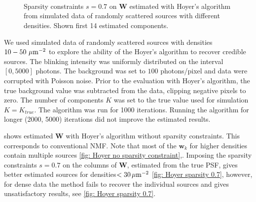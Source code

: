 \begin{figure}[b!] %
	\newcommand{\sizefig}{.9}
	\centering
	\\
	\\
	\\	
	\caption{Sparsity constraints $s=0.7$ on $\bm{W}$ estimated with Hoyer's algorithm from simulated data of randomly scattered sources with different densities. Shown first 14 estimated components.}
	\label{fig: Hoyer sparsity 0.7}
\end{figure}

We used simulated data of randomly scattered sources with densities $10-50\,\, \mathrm{\mu m}^{-2}$ to explore the ability of the Hoyer's algorithm to recover credible sources. The blinking intensity was uniformly distributed on the interval $[0, 5000]$ photons. The background was set to $100$ photons/pixel and data were corrupted with Poisson noise. Prior to the evaluation with Hoyer's algorithm, the true background value was subtracted from the data, clipping negative pixels to zero. The number of components $K$ was set to the true value used for simulation $K=K_{true}$. The algorithm was run for 1000 iterations. Running the algorithm for longer (2000, 5000) iterations did not improve the estimated results. 

 shows estimated $\bm{W}$ with Hoyer's algorithm without sparsity constraints. This corresponds to conventional NMF. Note that most of the $\bm{w}_k$ for higher densities contain multiple sources \autoref{fig: Hoyer no sparsity constraint}\bbb,\ccc. Imposing the sparsity constraints $s=0.7$ on the columns of $\bm{W}$, estimated from the true PSF, gives better estimated sources for densities$<30\, \mathrm{\mu m}^{-2}$  \autoref{fig: Hoyer sparsity 0.7}\aaa, however, for dense data the method fails to recover the individual sources and gives unsatisfactory results, see \autoref{fig: Hoyer sparsity 0.7}\ccc.

